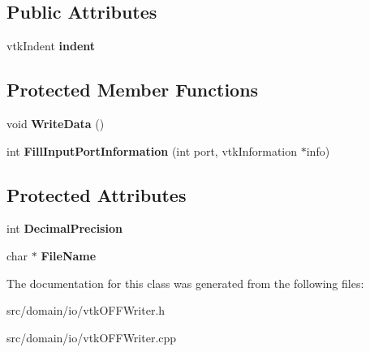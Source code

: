 \subsection*{Public Attributes}
\begin{DoxyCompactItemize}
\item 
\hypertarget{classvtk_o_f_f_writer_a5b206de2e06918f4f68d5a656206d238}{}vtk\+Indent {\bfseries indent}\label{classvtk_o_f_f_writer_a5b206de2e06918f4f68d5a656206d238}

\end{DoxyCompactItemize}
\subsection*{Protected Member Functions}
\begin{DoxyCompactItemize}
\item 
\hypertarget{classvtk_o_f_f_writer_a968f840eddac896d220209920c05b6f9}{}void {\bfseries Write\+Data} ()\label{classvtk_o_f_f_writer_a968f840eddac896d220209920c05b6f9}

\item 
\hypertarget{classvtk_o_f_f_writer_a3ab6ab473cf656b55ff02fa0ee21fd4a}{}int {\bfseries Fill\+Input\+Port\+Information} (int port, vtk\+Information $\ast$info)\label{classvtk_o_f_f_writer_a3ab6ab473cf656b55ff02fa0ee21fd4a}

\end{DoxyCompactItemize}
\subsection*{Protected Attributes}
\begin{DoxyCompactItemize}
\item 
\hypertarget{classvtk_o_f_f_writer_acb4b6b55b85fd4bdb203a11405f3b979}{}int {\bfseries Decimal\+Precision}\label{classvtk_o_f_f_writer_acb4b6b55b85fd4bdb203a11405f3b979}

\item 
\hypertarget{classvtk_o_f_f_writer_a97b7c8aeaba00eea627144073aba553f}{}char $\ast$ {\bfseries File\+Name}\label{classvtk_o_f_f_writer_a97b7c8aeaba00eea627144073aba553f}

\end{DoxyCompactItemize}


The documentation for this class was generated from the following files\+:\begin{DoxyCompactItemize}
\item 
src/domain/io/vtk\+O\+F\+F\+Writer.\+h\item 
src/domain/io/vtk\+O\+F\+F\+Writer.\+cpp\end{DoxyCompactItemize}

